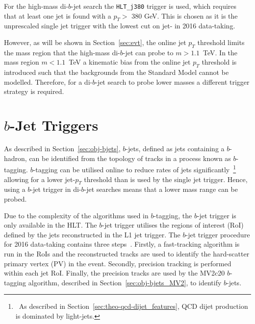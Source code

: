 
For the high-mass di-$b$-jet search the \verb|HLT_j380| trigger is used, which requires that at least one jet is found with a $p_T >$ 380 GeV.
This is chosen as it is the unprescaled single jet trigger with the lowest cut on jet-\pT{} in 2016 data-taking.

However, as will be shown in Section~\ref{sec:evt},
the online jet $p_T$ threshold limits the mass region that the high-mass di-$b$-jet can probe to $m > 1.1$~TeV.
In the mass region $m < 1.1$~TeV a kinematic bias from the online jet $p_T$ threshold is introduced
such that the backgrounds from the Standard Model cannot be modelled. 
Therefore, for a di-$b$-jet search to probe lower masses a different trigger strategy is required.

\section{$b$-Jet Triggers}
\label{sec:trig-bjet}

As described in Section~\ref{sec:obj-bjets}, $b$-jets, defined as jets containing a $b$-hadron,
can be identified from the topology of tracks in a process known as $b$-tagging.
$b$-tagging can be utilised online to reduce rates of jets significantly~\footnote{\ As described in Section~\ref{sec:theo-qcd-dijet_features},
  QCD dijet production is dominated by light-jets.}
allowing for a lower jet-$p_T$ threshold than is used by the single jet trigger.
Hence, using a $b$-jet trigger in di-$b$-jet searches means that a lower mass range can be probed.

Due to the complexity of the algorithms used in $b$-tagging,
the $b$-jet trigger is only available in the HLT.
The $b$-jet trigger utilises the regions of interest (RoI) defined by the jets reconstructed in the L1 jet trigger.
The $b$-jet trigger procedure for 2016 data-taking contains three steps~\cite{trig-bTrig_desc}.
Firstly, a fast-tracking algorithm is run in the RoIs and
the reconstructed tracks are used to identify the hard-scatter primary vertex (PV) in the event.
Secondly, precision tracking is performed within each jet RoI.
Finally, the precision tracks are used by the MV2c20 $b$-tagging algorithm, described in Section~\ref{sec:obj-bjets_MV2}, to identify $b$-jets.

